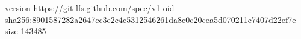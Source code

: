 version https://git-lfs.github.com/spec/v1
oid sha256:8901587282a2647cc3e2c4c5312546261da8c0c20cea5d070211c7407d22ef7e
size 143485
